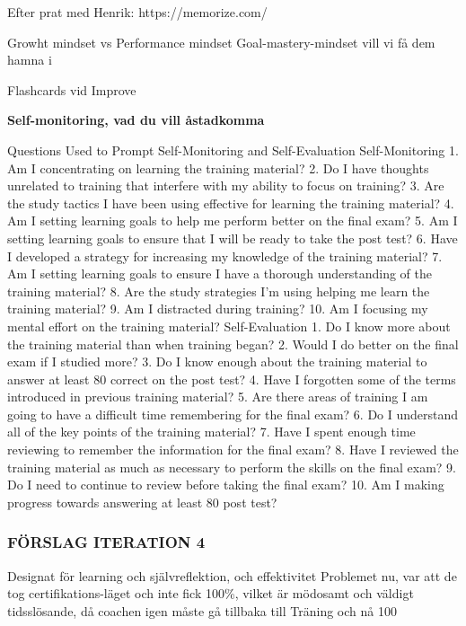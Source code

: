 Efter prat med Henrik:
https://memorize.com/

Growht mindset vs Performance mindset
Goal-mastery-mindset vill vi få dem hamna i

Flashcards vid Improve

\textbf{Self-monitoring, vad du vill åstadkomma}

Questions Used to Prompt Self-Monitoring and Self-Evaluation
Self-Monitoring
1. Am I concentrating on learning the training material?
2. Do I have thoughts unrelated to training that interfere with my ability to focus on training?
3. Are the study tactics I have been using effective for learning the training material?
4. Am I setting learning goals to help me perform better on the final exam?
5. Am I setting learning goals to ensure that I will be ready to take the post test?
6. Have I developed a strategy for increasing my knowledge of the training material?
7. Am I setting learning goals to ensure I have a thorough understanding of the training
material?
8. Are the study strategies I'm using helping me learn the training material?
9. Am I distracted during training?
10. Am I focusing my mental effort on the training material?
Self-Evaluation
1. Do I know more about the training material than when training began?
2. Would I do better on the final exam if I studied more?
3. Do I know enough about the training material to answer at least 80%
correct on the post test?
4. Have I forgotten some of the terms introduced in previous training material?
5. Are there areas of training I am going to have a difficult time remembering for the final
exam?
6. Do I understand all of the key points of the training material?
7. Have I spent enough time reviewing to remember the information for the final exam?
8. Have I reviewed the training material as much as necessary to perform the skills on the
final exam?
9. Do I need to continue to review before taking the final exam?
10. Am I making progress towards answering at least 80%
post test?

\subsubsection{FÖRSLAG ITERATION 4}

Designat för learning och självreflektion, och effektivitet
Problemet nu, var att de tog certifikations-läget och inte fick 100\%, vilket är mödosamt och väldigt tidsslösande, då coachen igen måste gå tillbaka till Träning och nå 100%

